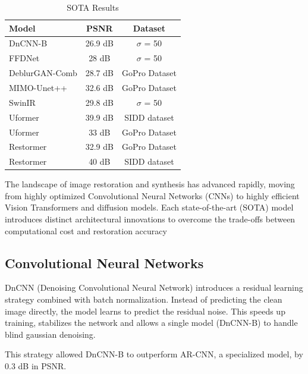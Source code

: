 \documentclass[conference]{IEEEtran}
\begin{document}
\begin{table}[b]
  \centering
  \caption{SOTA Results}
  \label{tab:sota}
  \begin{tabular}{l|c|c}
    \hline
    \textbf{Model} & \textbf{PSNR} & \textbf{Dataset} \\
    \hline
    \hline
    DnCNN-B\cite{beyond_a_gaussian} & 26.9 dB & $\sigma$ = 50 \\
    FFDNet\cite{FFDNet} & 28 dB & $\sigma$ = 50 \\
    DeblurGAN-Comb\cite{Deblurgan} & 28.7 dB & GoPro Dataset \\
    MIMO-Unet++\cite{Rethinking} & 32.6 dB & GoPro Dataset \\
    SwinIR\cite{Swinir} & 29.8 dB & $\sigma$ = 50 \\
    Uformer\cite{Uformer} & 39.9 dB & SIDD dataset \\
    Uformer\cite{Uformer} & 33 dB & GoPro Dataset \\
    Restormer\cite{Restormer} & 32.9 dB & GoPro Dataset \\
    Restormer\cite{Restormer} & 40 dB & SIDD dataset \\
    \hline
  \end{tabular}
\end{table}

The landscape of image restoration and synthesis has advanced rapidly, moving from highly optimized
Convolutional Neural Networks (CNNs) to highly efficient Vision Transformers and diffusion models.
Each state-of-the-art (SOTA) model introduces distinct architectural innovations to overcome the
trade-offs between computational cost and restoration accuracy

\subsection{Convolutional Neural Networks}

DnCNN (Denoising Convolutional Neural Network) introduces a residual learning strategy combined with
batch normalization. Instead of predicting the clean image directly, the model learns to predict the
residual noise. This speeds up training, stabilizes the network and allows a single model (DnCNN-B)
to handle blind gaussian denoising. \cite{beyond_a_gaussian}

This strategy allowed DnCNN-B to outperform AR-CNN, a specialized model, by 0.3 dB in PSNR.
\end{document}
